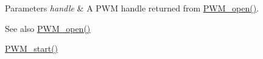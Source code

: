 \begin{DoxyParams}{Parameters}
{\em handle} & A P\+W\+M handle returned from \hyperlink{_p_w_m_8h_ac963beab0c5c6901bf852f175028aeaf}{P\+W\+M\+\_\+open()}.\\
\hline
\end{DoxyParams}
\begin{DoxySeeAlso}{See also}
\hyperlink{_p_w_m_8h_ac963beab0c5c6901bf852f175028aeaf}{P\+W\+M\+\_\+open()} 

\hyperlink{_p_w_m_8h_aa1bd0cc3f0fa52879422fca74d254378}{P\+W\+M\+\_\+start()} 
\end{DoxySeeAlso}
